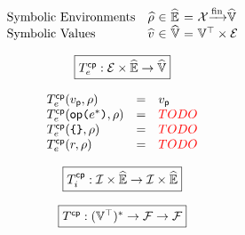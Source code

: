 \[
  \begin{array}{lr@{~}c@{~}l@{~}c@{~}l}
    \text{Symbolic Environments} & \senv &\in& \senvset &=&
    \varset \finmap \svalset\\
    \text{Symbolic Values} & \sval &\in& \svalset &=&
    \valoptset \times \exprset\\
  \end{array}
\]

\[
  \framebox{$\cptransforme: \exprset \times \senvset \rightarrow \svalset$}
\]

\[
  \begin{array}{lcl}
    T^{\textsf{cp}}_e(v_{\textsf{p}}, \rho) &=& v_{\textsf{p}}\\
    T^{\textsf{cp}}_e(\textsf{op} \texttt{(} e^* \texttt{)}, \rho) &=& {\color{red}{TODO}}\\
    T^{\textsf{cp}}_e(\texttt{\{} \texttt{\}}, \rho) &=& {\color{red}{TODO}}\\
    T^{\textsf{cp}}_e(r, \rho) &=& {\color{red}{TODO}}\\
  \end{array}
\]

\[
  \framebox{$\cptransformi: \instset \times \senvset \rightarrow \instset \times
  \senvset$}
\]

\todo

\[
  \framebox{$\cptransform: (\valoptset)^* \rightarrow \funcset \rightarrow
  \funcset$}
\]

\todo





% 
% 
% 
% 








